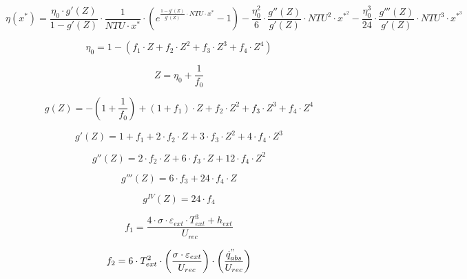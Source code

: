 \begin{equation}
    \eta(x^{*}) = \frac{\eta_{0} \cdot g'(Z)}{1-g'(Z)} \cdot \frac{1}{NTU \cdot x^{*}} \cdot \left(e^{\frac{1-g'(Z)}{g'(Z)}\cdot NTU \cdot x^{*}} - 1\right) - \frac{\eta_{0}^2}{6} \cdot \frac{g''(Z)}{g'(Z)} \cdot NTU^{2} \cdot x^{*^{2}} - \frac{\eta_{0}^{3}}{24} \cdot \frac{g'''(Z)}{g'(Z)} \cdot NTU^{3} \cdot x^{*^{3}}
    \label{eq:modelocompleto}
\end{equation}

\begin{equation}
    \eta_{0} = 1 - (f_{1} \cdot Z + f_{2} \cdot Z^{2} + f_{3} \cdot Z^{3} + f_{4} \cdot Z^{4})
    \label{eq:rendimiento0}
\end{equation}

\begin{equation}
    Z = \eta_{0} + \frac{1}{f_{0}} 
    \label{eq:zeta}
\end{equation}

\begin{equation}
    g(Z) = -\left(1+\frac{1}{f_{0}}\right)+(1+f_{1})\cdot Z + f_{2}\cdot Z^{2} +  f_{3}\cdot Z^{3} + f_{4}\cdot Z^{4} 
    \label{eq:gdezeta}
\end{equation}

\begin{equation}
    g'(Z) = 1 + f_{1} + 2 \cdot f_{2} \cdot Z + 3 \cdot f_{3} \cdot Z^{2} + 4 \cdot f_{4} \cdot Z^{3} 
    \label{eq:gprimadezeta}
\end{equation}

\begin{equation}
    g''(Z) = 2 \cdot f_{2} \cdot Z + 6 \cdot f_{3} \cdot Z + 12 \cdot f_{4} \cdot Z^{2} 
    \label{eq:g2primadezeta}
\end{equation}

\begin{equation}
    g'''(Z) = 6 \cdot f_{3} + 24 \cdot f_{4} \cdot Z
    \label{eq:g3primadezeta}
\end{equation}

\begin{equation}
    g^{IV}(Z) = 24 \cdot f_{4}
    \label{eq:g4primadezeta}
\end{equation}

\begin{equation}
    f_{1} = \frac{4 \cdot \sigma \cdot \varepsilon_{ext} \cdot T_{ext}^{3} + h_{ext}}{U_{rec}}
    \label{eq:f1}
\end{equation}

\begin{equation}
    f_{2} = 6 \cdot T_{ext}^{2} \cdot \left(\frac{\sigma \cdot \varepsilon_{ext}}{U_{rec}} \right) \cdot \left(\frac{\dot{q}^{"}_{abs}}{U_{rec}}\right) 
    \label{eq:f2}
\end{equation}

